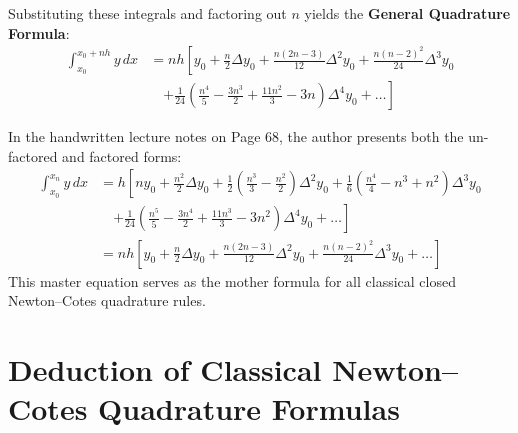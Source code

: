 \begin{theorembox}
Substituting these integrals and factoring out $n$ yields the \textbf{General Quadrature Formula}:
\begin{equation}
\boxed{
\begin{aligned}
    \int_{x_0}^{x_0 + n h} y \, dx &= n h \left[ y_0 + \frac{n}{2} \Delta y_0 + \frac{n(2n-3)}{12} \Delta^2 y_0 + \frac{n(n-2)^2}{24} \Delta^3 y_0 \right. \\
    &\quad \left. + \frac{1}{24} \left( \frac{n^4}{5} - \frac{3n^3}{2} + \frac{11n^2}{3} - 3n \right) \Delta^4 y_0 + \dots \right]
\end{aligned}
}
\end{equation}
\end{theorembox}

\begin{notebox}
In the handwritten lecture notes on Page 68, the author presents both the un-factored and factored forms:
\begin{align}
    \int_{x_0}^{x_n} y \, dx &= h \left[ n y_0 + \frac{n^2}{2} \Delta y_0 + \frac{1}{2}\left(\frac{n^3}{3} - \frac{n^2}{2}\right)\Delta^2 y_0 + \frac{1}{6}\left(\frac{n^4}{4} - n^3 + n^2\right)\Delta^3 y_0 \right. \nonumber \\
    &\quad \left. + \frac{1}{24}\left(\frac{n^5}{5} - \frac{3n^4}{2} + \frac{11n^3}{3} - 3n^2\right)\Delta^4 y_0 + \dots \right] \\
    &= n h \left[ y_0 + \frac{n}{2}\Delta y_0 + \frac{n(2n-3)}{12}\Delta^2 y_0 + \frac{n(n-2)^2}{24}\Delta^3 y_0 + \dots \right]
\end{align}
This master equation serves as the mother formula for all classical closed Newton--Cotes quadrature rules.
\end{notebox}

\section{Deduction of Classical Newton--Cotes Quadrature Formulas}
\label{sec:deductions_newton_cotes}

